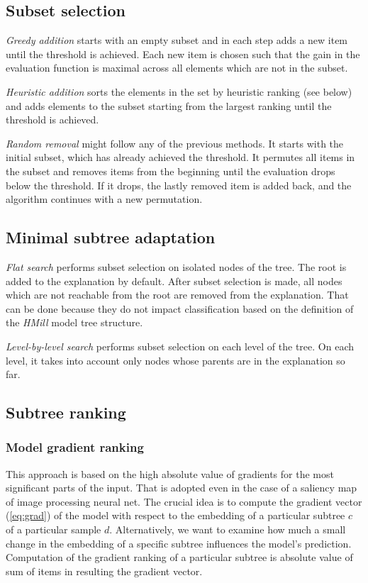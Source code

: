 \subsection{Subset selection}
\emph{Greedy addition} starts with an empty subset and in each step adds a new item until the threshold is achieved. Each new item is chosen such that the gain in the evaluation function is maximal across all elements which are not in the subset.

\emph{Heuristic addition} sorts the elements in the set by heuristic ranking (see below) and adds elements to the subset starting from the largest ranking until the threshold is achieved.

\emph{Random removal} might follow any of the previous methods. It starts with the initial subset, which has already achieved the threshold. It permutes all items in the subset and removes items from the beginning until the evaluation drops below the threshold. If it drops, the lastly removed item is added back, and the algorithm continues with a new permutation.
\subsection{Minimal subtree adaptation}
\emph{Flat search} performs subset selection on isolated nodes of the tree. The root is added to the explanation by default. After subset selection is made, all nodes which are not reachable from the root are removed from the explanation. That can be done because they do not impact classification based on the definition of the \emph{HMill} model tree structure.

\emph{Level-by-level search} performs subset selection on each level of the tree. On each level, it takes into account only nodes whose parents are in the explanation so far.

\subsection{Subtree ranking}
\subsubsection{Model gradient ranking}
This approach is based on the high absolute value of gradients for the most significant parts of the input. That is adopted even in the case of a saliency map of image processing neural net. The crucial idea is to compute the gradient vector (\ref{eq:grad}) of the model with respect to the embedding of a particular subtree $c$ of a particular sample $d$. Alternatively, we want to examine how much a small change in the embedding of a specific subtree influences the model's prediction. Computation of the gradient ranking of a particular subtree is absolute value of sum of items in resulting the gradient vector.

